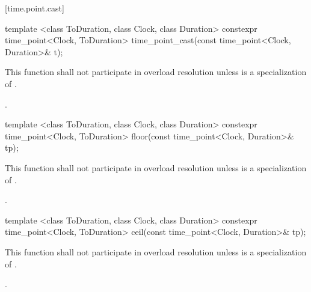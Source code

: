 [time.point.cast]{}

%
%
\begin{itemdecl}
template <class ToDuration, class Clock, class Duration>
  constexpr time_point<Clock, ToDuration>
  time_point_cast(const time_point<Clock, Duration>& t);
\end{itemdecl}

\begin{itemdescr}
\pnum
\remarks This function shall not participate in overload resolution
unless  is a specialization of .

\pnum
\returns {}.
\end{itemdescr}

%
%
\begin{itemdecl}
template <class ToDuration, class Clock, class Duration>
  constexpr time_point<Clock, ToDuration>
  floor(const time_point<Clock, Duration>& tp);
\end{itemdecl}

\begin{itemdescr}
\pnum
\remarks This function shall not participate in overload resolution
unless  is a specialization of .

\pnum
\returns {}.
\end{itemdescr}

%
%
\begin{itemdecl}
template <class ToDuration, class Clock, class Duration>
  constexpr time_point<Clock, ToDuration>
  ceil(const time_point<Clock, Duration>& tp);
\end{itemdecl}

\begin{itemdescr}
\pnum
\remarks This function shall not participate in overload resolution
unless  is a specialization of .

\pnum
\returns {}.
\end{itemdescr}

